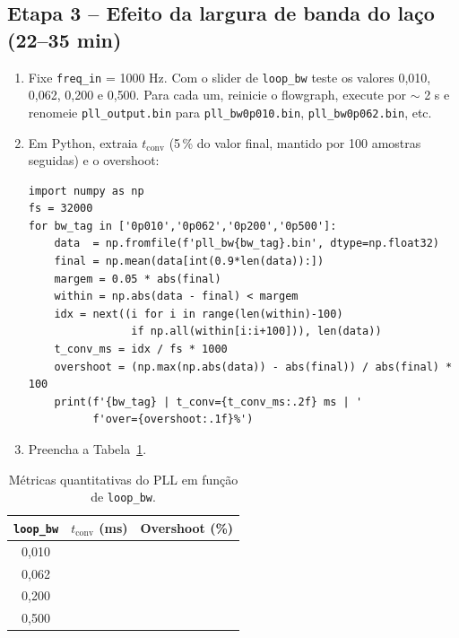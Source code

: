 \documentclass[11pt,a4paper]{article}
\begin{document}
\subsection*{Etapa 3 -- Efeito da largura de banda do laço (22--35 min)}

\begin{instrucao}
\begin{enumerate}[label=\arabic*.]
  \item Fixe \texttt{freq\_in} = 1000 Hz. Com o slider de \texttt{loop\_bw}
    teste os valores 0{,}010, 0{,}062, 0{,}200 e 0{,}500. Para cada um,
    reinicie o flowgraph, execute por $\sim$ 2 s e renomeie
    \texttt{pll\_output.bin} para \texttt{pll\_bw0p010.bin},
    \texttt{pll\_bw0p062.bin}, etc.
  \item Em Python, extraia $t_\text{conv}$ (5\,\% do valor final, mantido por
    100 amostras seguidas) e o overshoot:
\begin{verbatim}
import numpy as np
fs = 32000
for bw_tag in ['0p010','0p062','0p200','0p500']:
    data  = np.fromfile(f'pll_bw{bw_tag}.bin', dtype=np.float32)
    final = np.mean(data[int(0.9*len(data)):])
    margem = 0.05 * abs(final)
    within = np.abs(data - final) < margem
    idx = next((i for i in range(len(within)-100)
                if np.all(within[i:i+100])), len(data))
    t_conv_ms = idx / fs * 1000
    overshoot = (np.max(np.abs(data)) - abs(final)) / abs(final) * 100
    print(f'{bw_tag} | t_conv={t_conv_ms:.2f} ms | '
          f'over={overshoot:.1f}%')
\end{verbatim}
  \item Preencha a Tabela~\ref{tab:pll}.
\end{enumerate}
\end{instrucao}

\begin{table}[H]
  \centering
  \begin{tabular}{c c c}
    \toprule
    \texttt{loop\_bw} & $t_\text{conv}$ (ms) & Overshoot (\%) \\
    \midrule
    0{,}010 & & \\
    0{,}062 & & \\
    0{,}200 & & \\
    0{,}500 & & \\
    \bottomrule
  \end{tabular}
  \caption{Métricas quantitativas do PLL em função de \texttt{loop\_bw}.}
  \label{tab:pll}
\end{table}
\end{document}
